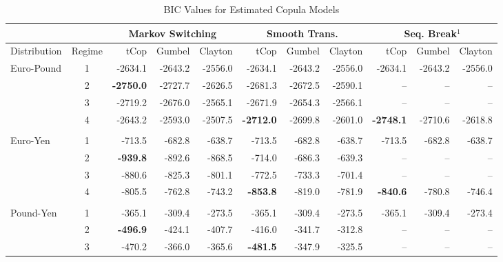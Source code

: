 \documentclass[12pt]{article}
\begin{document}
\begin{landscape}

\begin{table}
	\caption{BIC Values for Estimated Copula Models}
	\fontsize{9pt}{9pt}\selectfont
	\centering
	\begin{tabular}[c]{l c r r r | r r r | r r r}
		\midrule
		            &        & \multicolumn{3}{c}{Markov Switching} & \multicolumn{3}{c}{Smooth Trans.} & \multicolumn{3}{c}{Seq. Break$^{1}$} \\
		\midrule
		Distribution& Regime & tCop & Gumbel & Clayton & tCop & Gumbel & Clayton & tCop & Gumbel & Clayton \\
		\midrule
		Euro-Pound  & 1 &          -2634.1 & -2643.2 & -2556.0 &          -2634.1 & -2643.2 & -2556.0 &           -2634.1 & -2643.2 &  -2556.0  \\		
		            & 2 & \textbf{-2750.0} & -2727.7 & -2626.5 &          -2681.3 & -2672.5 & -2590.1 &                -- &      -- &  --       \\
					& 3 &          -2719.2 & -2676.0 & -2565.1 &          -2671.9 & -2654.3 & -2566.1 &                -- &      -- &  --       \\
					& 4 &          -2643.2 & -2593.0 & -2507.5 & \textbf{-2712.0} & -2699.8 & -2601.0 &  \textbf{-2748.1} & -2710.6 &  -2618.8  \\ \\
		Euro-Yen    & 1 &           -713.5 &  -682.8 &  -638.7 &           -713.5 &  -682.8 &  -638.7 &            -713.5 &  -682.8 &   -638.7  \\
		            & 2 &  \textbf{-939.8} &  -892.6 &  -868.5 &           -714.0 &  -686.3 &  -639.3 &                -- &      -- &  --       \\
				    & 3 &           -880.6 &  -825.3 &  -801.1 &           -772.5 &  -733.3 &  -701.4 &                -- &      -- &  --       \\
				    & 4 &           -805.5 &  -762.8 &  -743.2 &  \textbf{-853.8} &  -819.0 &  -781.9 &   \textbf{-840.6} &  -780.8 &   -746.4  \\ \\
		Pound-Yen   & 1 &           -365.1 &  -309.4 &  -273.5 &           -365.1 &  -309.4 &  -273.5 &            -365.1 &  -309.4 &   -273.4  \\
		            & 2 &  \textbf{-496.9} &  -424.1 &  -407.7 &           -416.0 &  -341.7 &  -312.8 &                -- &      -- &  --       \\
				    & 3 &           -470.2 &  -366.0 &  -365.6 &  \textbf{-481.5} &  -347.9 &  -325.5 &                -- &      -- &  --       \\

\end{tabular}
\end{table}
\end{landscape}
\end{document}
